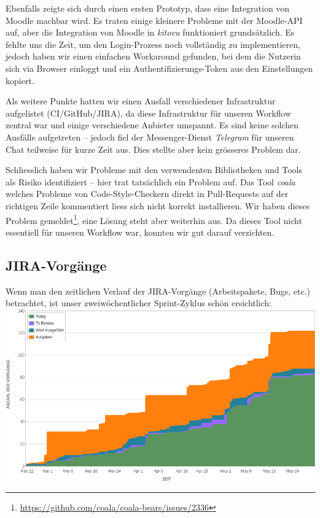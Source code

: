 \documentclass[a4paper]{article}
\begin{document}
Ebenfalls zeigte sich durch einen ersten Prototyp, dass eine Integration von
Moodle machbar wird. Es traten einige kleinere Probleme mit der Moodle-API auf,
aber die Integration von Moodle in \emph{kitovu} funktioniert grundsätzlich. Es
fehlte uns die Zeit, um den Login-Prozess noch vollständig zu implementieren,
jedoch haben wir einen einfachen Workaround gefunden, bei dem die Nutzerin sich
via Browser einloggt und ein Authentifizierungs-Token aus den Einstellungen kopiert.

Als weitere Punkte hatten wir einen Ausfall verschiedener Infrastruktur
aufgelistet (CI/GitHub/JIRA), da diese Infrastruktur für unseren Workflow
zentral war und einige verschiedene Anbieter umspannt. Es sind keine solchen
Ausfälle aufgetreten -- jedoch fiel der Messenger-Dienst \emph{Telegram} für
unseren Chat teilweise für kurze Zeit aus. Dies stellte aber kein grösseres
Problem dar.

Schliesslich haben wir Probleme mit den verwendenten Bibliotheken und Tools
als Risiko identifiziert -- hier trat tatsächlich ein Problem auf. Das Tool
\emph{coala} welches Probleme von Code-Style-Checkern direkt in
Pull-Requests auf der richtigen Zeile kommentiert liess sich nicht korrekt
installieren. Wir haben dieses Problem
gemeldet\footnote{\url{https://github.com/coala/coala-bears/issues/2336}}, eine
Lösung steht aber weiterhin aus. Da dieses Tool nicht essentiell für unseren
Workflow war, konnten wir gut darauf verzichten.

\subsection{JIRA-Vorgänge}

Wenn man den zeitlichen Verlauf der JIRA-Vorgänge (Arbeitspakete, Bugs, etc.)
betrachtet, ist unser zweiwöchentlicher Sprint-Zyklus schön ersichtlich: \\

\includegraphics[width=\linewidth]{img/issues.png}
\end{document}
